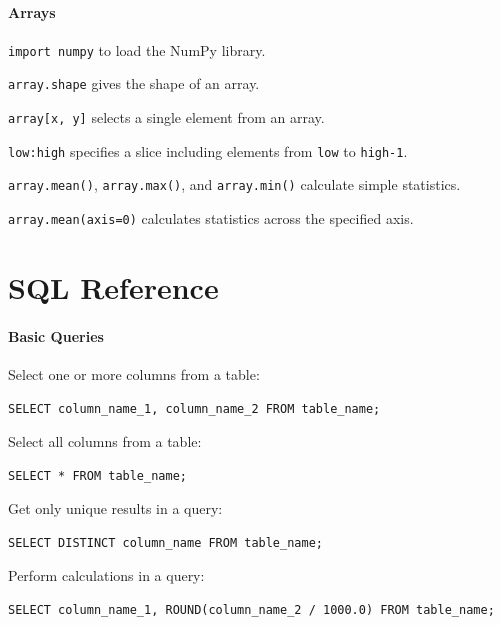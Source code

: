 \documentclass{book}
\begin{document}
\mbox{}\paragraph{Arrays}

\begin{swcitemize}
\item
  \texttt{import numpy} to load the NumPy library.
\item
  \texttt{array.shape} gives the shape of an array.
\item
  \texttt{array{[}x, y{]}} selects a single element from an array.
\item
  \texttt{low:high} specifies a slice including elements from
  \texttt{low} to \texttt{high-1}.
\item
  \texttt{array.mean()}, \texttt{array.max()}, and \texttt{array.min()}
  calculate simple statistics.
\item
  \texttt{array.mean(axis=0)} calculates statistics across the specified
  axis.
\end{swcitemize}

\section{SQL Reference}

\mbox{}\paragraph{Basic Queries}

Select one or more columns from a table:

\begin{verbatim}
SELECT column_name_1, column_name_2 FROM table_name;
\end{verbatim}

Select all columns from a table:

\begin{verbatim}
SELECT * FROM table_name;
\end{verbatim}

Get only unique results in a query:

\begin{verbatim}
SELECT DISTINCT column_name FROM table_name;
\end{verbatim}

Perform calculations in a query:

\begin{verbatim}
SELECT column_name_1, ROUND(column_name_2 / 1000.0) FROM table_name;
\end{verbatim}
\end{document}

